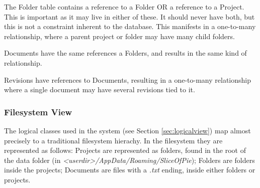 The Folder table contains a reference to a Folder OR a reference to a Project. This is important as
it may live in either of these. It should never have both, but this is not a constraint inherent to
the database. This manifests in a one-to-many relationship, where a parent project or folder may have
many child folders.

Documents have the same references a Folders, and results in the same kind of relationship.

Revisions have references to Documents, resulting in a one-to-many relationship where a single document
may have several revisions tied to it.

\subsubsection{Filesystem View}
The logical classes used in the system (see Section \ref{sec:logicalview}) map almost precisely to a
traditional filesystem hierachy. In the filesystem they are represented as follows: Projects are
represented as folders, found in the root of the data folder (in \emph{<userdir>/AppData/Roaming/SliceOfPie});
Folders are folders inside the projects; Documents are files with a \emph{.txt} ending, inside either folders
or projects.